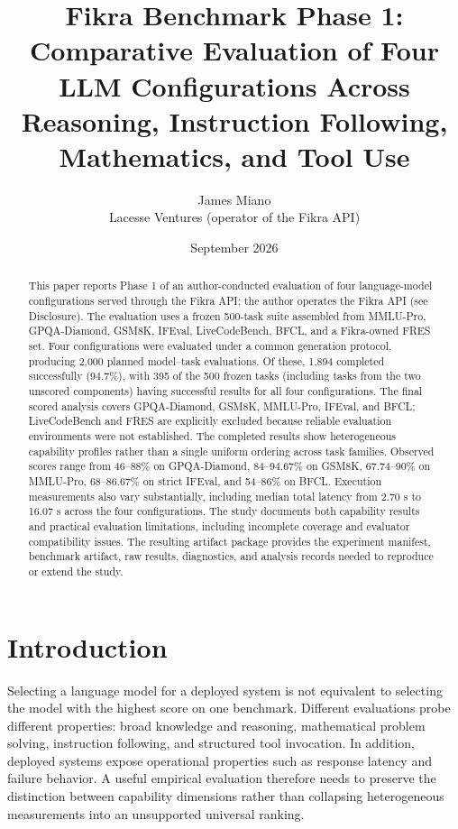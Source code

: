 \documentclass[11pt]{article}
\title{Fikra Benchmark Phase 1: Comparative Evaluation of Four LLM Configurations Across Reasoning, Instruction Following, Mathematics, and Tool Use}
\author{James Miano\\Lacesse Ventures (operator of the Fikra API)}
\date{September 2026}
\begin{document}
\maketitle

\begin{abstract}
This paper reports Phase 1 of an author-conducted evaluation of four language-model configurations served through the Fikra API; the author operates the Fikra API (see Disclosure). The evaluation uses a frozen 500-task suite assembled from MMLU-Pro, GPQA-Diamond, GSM8K, IFEval, LiveCodeBench, BFCL, and a Fikra-owned FRES set. Four configurations were evaluated under a common generation protocol, producing 2,000 planned model--task evaluations. Of these, 1,894 completed successfully (94.7\%), with 395 of the 500 frozen tasks (including tasks from the two unscored components) having successful results for all four configurations. The final scored analysis covers GPQA-Diamond, GSM8K, MMLU-Pro, IFEval, and BFCL; LiveCodeBench and FRES are explicitly excluded because reliable evaluation environments were not established. The completed results show heterogeneous capability profiles rather than a single uniform ordering across task families. Observed scores range from 46--88\% on GPQA-Diamond, 84--94.67\% on GSM8K, 67.74--90\% on MMLU-Pro, 68--86.67\% on strict IFEval, and 54--86\% on BFCL. Execution measurements also vary substantially, including median total latency from 2.70 s to 16.07 s across the four configurations. The study documents both capability results and practical evaluation limitations, including incomplete coverage and evaluator compatibility issues. The resulting artifact package provides the experiment manifest, benchmark artifact, raw results, diagnostics, and analysis records needed to reproduce or extend the study.
\end{abstract}

\section{Introduction}
Selecting a language model for a deployed system is not equivalent to selecting the model with the highest score on one benchmark. Different evaluations probe different properties: broad knowledge and reasoning, mathematical problem solving, instruction following, and structured tool invocation. In addition, deployed systems expose operational properties such as response latency and failure behavior. A useful empirical evaluation therefore needs to preserve the distinction between capability dimensions rather than collapsing heterogeneous measurements into an unsupported universal ranking.
\end{document}
